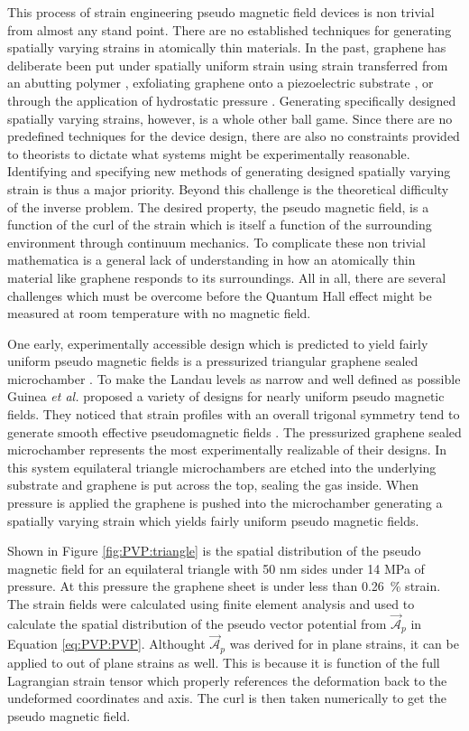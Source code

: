 This process of strain engineering pseudo magnetic field devices is non trivial from almost any stand point.
There are no established techniques for generating spatially varying strains in atomically thin materials.
In the past, graphene has deliberate been put under spatially uniform strain using strain transferred from an abutting polymer \cite{Yu2008,Ni2008,Tsoukleri2009,Huang2009,Mohiuddin2009,Frank2010,Yoon2011}, exfoliating graphene onto a piezoelectric substrate \cite{Ding2010,Jie2013}, or through the application of hydrostatic pressure \cite{Proctor2009,Clark2012}.
Generating specifically designed spatially varying strains, however, is a whole other ball game.
Since there are no predefined techniques for the device design, there are also no constraints provided to theorists to dictate what systems might be experimentally reasonable.
Identifying and specifying new methods of generating designed spatially varying strain is thus a major priority.
Beyond this challenge is the theoretical difficulty of the inverse problem.
The desired property, the pseudo magnetic field, is a function of the curl of the strain which is itself a function of the surrounding environment through continuum mechanics.
To complicate these non trivial mathematica is a general lack of understanding in how an atomically thin material like graphene responds to its surroundings.
All in all, there are several challenges which must be overcome before the Quantum Hall effect might be measured at room temperature with no magnetic field.

One early, experimentally accessible design which is predicted to yield fairly uniform pseudo magnetic fields is a pressurized triangular graphene sealed microchamber \cite{Guinea2009}.
To make the Landau levels as narrow and well defined as possible Guinea \emph{et al.} proposed a variety of designs for nearly uniform pseudo magnetic fields.
They noticed that strain profiles with an overall trigonal symmetry tend to generate smooth effective pseudomagnetic fields \cite{Guinea2009}.
The pressurized graphene sealed microchamber represents the most experimentally realizable of their designs.
In this system equilateral triangle microchambers are etched into the underlying substrate and graphene is put across the top, sealing the gas inside.
When pressure is applied the graphene is pushed into the microchamber generating a spatially varying strain which yields fairly uniform pseudo magnetic fields.

Shown in Figure \ref{fig:PVP:triangle} is the spatial distribution of the pseudo magnetic field for an equilateral triangle with 50 nm sides under 14 MPa of pressure.
At this pressure the graphene sheet is under less than 0.26~\% strain.
The strain fields were calculated using finite element analysis and used to calculate the spatial distribution of the pseudo vector potential from $\vec{\mathcal{A}}_p$ in Equation \ref{eq:PVP:PVP}.
Althought $\vec{\mathcal{A}}_p$ was derived for in plane strains, it can be applied to out of plane strains as well.
This is because it is function of the full Lagrangian strain tensor which properly references the deformation back to the undeformed coordinates and axis.
The curl is then taken numerically to get the pseudo magnetic field.

